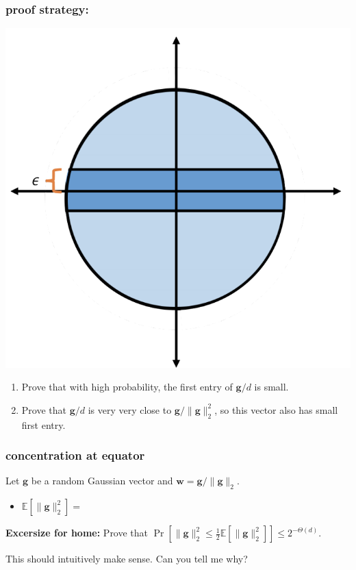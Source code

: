 \documentclass[compress]{beamer}
\newcommand{\bv}[1]{\mathbf{#1}}
\newcommand{\E}{\mathbb{E}}
\begin{document}
\begin{frame}
	\frametitle{proof strategy:} 
	\begin{center}
	\includegraphics[width=.5\textwidth]{equator.png}
	\end{center}

	\begin{enumerate}
		\item Prove that with high probability, the first entry of $\bv{g}/d$ is small. 
		\item Prove that $\bv{g}/d$ is very very close to $\bv{g}/\|\bv{g}\|_2^2$, so this vector also has small first entry.
	\end{enumerate}
\end{frame}

\begin{frame}[t]
	\frametitle{concentration at equator}
	Let $\bv{g}$ be a random Gaussian vector and $\bv{w} = \bv{g}/\|\bv{g}\|_2$.
	\begin{itemize}
		\item $\E[\|\bv{g}\|_2^2] = $
		\vspace{3em}
	\end{itemize} 
\textbf{Excersize for home:} Prove that $\Pr\left[\|\bv{g}\|_2^2\leq \frac{1}{2}\E[\|\bv{g}\|_2^2]\right] \leq 2^{-\Theta(d)}$. 

This should intuitively make sense. Can  you tell me why?
\end{frame}
\end{document}
